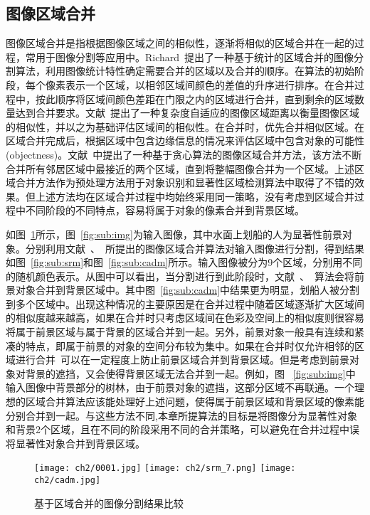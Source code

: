 \subsection{图像区域合并}
\label{sec:regionMerging}
图像区域合并是指根据图像区域之间的相似性，逐渐将相似的区域合并在一起的过程，常用于图像分割等应用中。Richard~\cite{Richard2004Statistical}提出了一种基于统计的区域合并的图像分割算法，利用图像统计特性确定需要合并的区域以及合并的顺序。在算法的初始阶段，每个像素表示一个区域，以相邻区域间颜色的差值的升序进行排序。在合并过程中，按此顺序将区域间颜色差距在门限之内的区域进行合并，直到剩余的区域数量达到合并要求。文献~提出了一种复杂度自适应的图像区域距离以衡量图像区域的相似性，并以之为基础评估区域间的相似性。在合并时，优先合并相似区域。在区域合并完成后，根据区域中包含边缘信息的情况来评估区域中包含对象的可能性(objectness)。文献~中提出了一种基于贪心算法的图像区域合并方法，该方法不断合并所有邻居区域中最接近的两个区域，直到将整幅图像合并为一个区域。上述区域合并方法作为预处理方法用于对象识别和显著性区域检测算法中取得了不错的效果。但上述方法均在区域合并过程中均始终采用同一策略，没有考虑到区域合并过程中不同阶段的不同特点，容易将属于对象的像素合并到背景区域。\par
如图~\ref{fig:rm}所示，图~\ref{fig:sub:img}为输入图像，其中水面上划船的人为显著性前景对象。分别利用文献~、~所提出的图像区域合并算法对输入图像进行分割，得到结果如图~\ref{fig:sub:srm}和图~\ref{fig:sub:cadm}所示。输入图像被分为9个区域，分别用不同的随机颜色表示。从图中可以看出，当分割进行到此阶段时，文献~、~算法会将前景对象合并到背景区域中。其中图~\ref{fig:sub:cadm}中结果更为明显，划船人被分割到多个区域中。出现这种情况的主要原因是在合并过程中随着区域逐渐扩大区域间的相似度越来越高，如果在合并时只考虑区域间在色彩及空间上的相似度则很容易将属于前景区域与属于背景的区域合并到一起。另外，前景对象一般具有连续和紧凑的特点，即属于前景的对象的空间分布较为集中。如果在合并时仅允许相邻的区域进行合并~\cite{SelectiveSearch}可以在一定程度上防止前景区域合并到背景区域。但是考虑到前景对象对背景的遮挡，又会使得背景区域无法合并到一起。例如，图 ~\ref{fig:sub:img}中输入图像中背景部分的树林，由于前景对象的遮挡，这部分区域不再联通。一个理想的区域合并算法应该能处理好上述问题，使得属于前景区域和背景区域的像素能分别合并到一起。与这些方法不同,本章所提算法的目标是将图像分为显著性对象和背景2个区域，且在不同的阶段采用不同的合并策略，可以避免在合并过程中误将显著性对象合并到背景区域。
\begin{figure}[htb]
  \centering%
    {\texttt{[image: ch2/0001.jpg]}}%
 \hspace{1em}%
      {\texttt{[image: ch2/srm\_7.png]}}
 \hspace{1em}
      {\texttt{[image: ch2/cadm.jpg]}}
  \caption{基于区域合并的图像分割结果比较}
  \label{fig:rm}
\end{figure}


